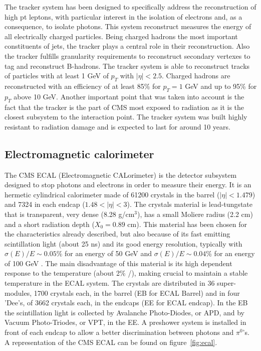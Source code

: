 The tracker system has been designed to specifically address the reconstruction of high pt leptons, with particular interest in the isolation of electrons and, as a consequence, to isolate photons. This system reconstruct measures the energy of all electrically charged particles. Being charged hadrons the most important constituents of jets, the tracker plays a central role in their reconstruction. Also the tracker fulfills granularity requirements to reconstruct secondary vertexes to tag and reconstruct B-hadrons. The tracker system is able to reconstruct tracks of particles with at least 1 GeV of $p_{T}$ with $|\eta|<2.5$. Charged hadrons are reconstructed with an efficiency of at least 85\% for $p_{T}=1$ GeV and up to 95\% for $p_{T}$ above 10 GeV. Another important point that was taken into account is the fact that the tracker is the part of CMS most exposed to radiation as it is the closest subsystem to the interaction point. The tracker system was built highly resistant to radiation damage and is expected to last for around 10 years. %

\subsection{Electromagnetic calorimeter}
\label{sec:ecal}

The CMS ECAL (Electromagnetic CALorimeter) is the detector subsystem designed to stop photons and electrons in order to measure their energy. It is an hermetic cylindrical calorimeter made of 61200 crystals in the barrel ($|\eta|<1.479$) and 7324 in each endcap ($1.48<|\eta|<3$). The crystals material is lead-tungstate that is transparent, very dense (8.28 g/$\text{cm}^{3}$), has a small Moliere radius (2.2 cm) and a short radiation depth ($X_{0}=0.89$ cm). This material has been chosen for the characteristics already described, but also because of its fast emitting scintillation light (about 25 ns) and its good energy resolution, typically with $\sigma(E)/E\sim 0.05$\% for an energy of 50 GeV and $\sigma(E)/E\sim 0.04$\% for an energy of 100 GeV . The main disadvantage of this material is its high dependent response to the temperature (about 2\% /\celsius), making crucial to maintain a stable temperature in the ECAL system. The crystals are distributed in 36 super-modules, 1700 crystals each, in the barrel (EB for ECAL Barrel) and in four 'Dee's, of 3662 crystals each, in the endcaps (EE for ECAL endcap). In the EB the scintillation light is collected by Avalanche Photo-Diodes, or APD, and by Vacuum Photo-Triodes, or VPT, in the EE. A preshower system is installed in front of each endcap to allow a better discrimination between photons and $\pi^{0}$'s. A representation of the CMS ECAL can be found on figure~\ref{fig:ecal}.

